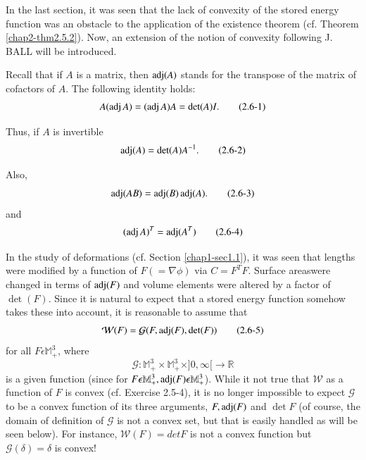 In the last section, it was seen that the lack of convexity of the
stored energy function was an obstacle to the application of the
existence theorem (cf. Theorem \ref{chap2-thm2.5.2}). 
Now, an extension of the notion of convexity following J. BALL will be
introduced.  

Recall that if $A$ is a matrix, then $\operatorname{adj} (A)$ stands for the transpose
of the matrix of cofactors of $A$. The following identity holds:  
\begin{equation*}
A(\operatorname{adj} A) =(\operatorname{adj} A) A = \det (A) I. \tag{2.6-1}\label{eq2.6-1}
\end{equation*}

Thus, if $A$ is invertible
\begin{equation*}
\operatorname{adj}  (A) = \det (A) A^{-1}. \tag{2.6-2}\label{eq2.6-2}
\end{equation*}

Also,
\begin{equation*}
\operatorname{adj}  (AB) = \operatorname{adj}  (B) \operatorname{adj} (A). \tag{2.6-3}
\end{equation*}
and
\begin{equation*}
(\operatorname{adj}  A)^T = \operatorname{adj}  (A^T) \tag{2.6-4} 
\end{equation*}

In the study of deformations (cf. Section \ref{chap1-sec1.1}), it was
seen that lengths were modified by a function of $F(= \nabla \phi)$ via $C
= F^T F$. Surface areas\pageoriginale were changed in terms of $\operatorname{adj}
(F)$ and volume 
elements were altered by a factor of $\det(F)$. Since it is natural to
expect that a stored energy function somehow takes these into account,
it is reasonable to assume that  
\begin{equation*}
  \mathcal{W}(F) = \mathcal{G}(F, \operatorname{adj}  (F), \det
  (F)) \tag{2.6-5}\label{eq2.6-5} 
\end{equation*}
for all $F \epsilon \mathbb{M}^3_+$, where
$$
\mathcal{G}:\mathbb{M}^3_+ \times \mathbb{M}^3_+ \times ] 0, \infty [
    \rightarrow \mathbb{R}  
$$
is a given function (since for $F \epsilon \mathbb{M}^3_+, \operatorname{adj}  (F)
\epsilon \mathbb{M}^3_+$). While it not true that $\mathcal{W}$ as a
function of $F$ is convex (cf. Exercise 2.5-4), it is no longer
impossible to expect $\mathcal{G}$ to be a convex function of its
three arguments, $F, \operatorname{adj}  (F)$ and $\det F$ (of course, the domain of
definition of $\mathcal{G}$ is not a convex set, but that is easily
handled as will be seen below). For instance, $\mathcal{W}(F) = det F$
is not a convex function but $\mathcal{G}(\delta) = \delta$ is convex! 

